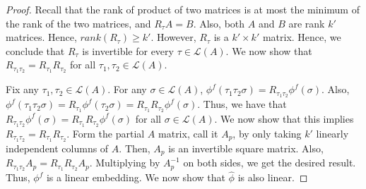 \documentclass[prodmode,acmec]{ec-acmsmall}
\newcommand{\calL}{{\mathcal{L}}}
\newcommand{\rank}{{\calL(A)}}
\begin{document}
\begin{proof}
Recall that the rank of product of two matrices is at most the minimum of the rank of the two matrices, and $R_{\tau} A = B$. Also, both $A$ and $B$ are rank $k'$ matrices. Hence, $rank(R_{\tau}) \ge k'$. However, $R_{\tau}$ is a $k' \times k'$ matrix. Hence, we conclude that $R_{\tau}$ is invertible for every $\tau \in \rank$. We now show that $R_{\tau_1 \tau_2} = R_{\tau_1} R_{\tau_2}$ for all $\tau_1,\tau_2 \in \rank$. 

%

Fix any $\tau_1,\tau_2 \in \rank$. For any $\sigma \in \rank$, $\phi^f(\tau_1 \tau_2 \sigma) = R_{\tau_1 \tau_2} \phi^f(\sigma)$. Also, $\phi^f(\tau_1 \tau_2 \sigma) = R_{\tau_1} \phi^f(\tau_2 \sigma) = R_{\tau_1}R_{\tau_2} \phi^f(\sigma)$. Thus, we have that $R_{\tau_1 \tau_2} \phi^f(\sigma) = R_{\tau_1} R_{\tau_2} \phi^f(\sigma)$ for all $\sigma \in \rank$. We now show that this implies $R_{\tau_1 \tau_2} = R_{\tau_1} R_{\tau_2}$. Form the partial $A$ matrix, call it $A_p$, by only taking $k'$ linearly independent columns of $A$. Then, $A_p$ is an invertible square matrix. Also, $R_{\tau_1 \tau_2} A_p = R_{\tau_1} R_{\tau_2} A_p$. Multiplying by $A_p^{-1}$ on both sides, we get the desired result. Thus, $\phi^f$ is a linear embedding. We now show that $\hat{\phi}$ is also linear. 


\end{proof}
\end{document}
